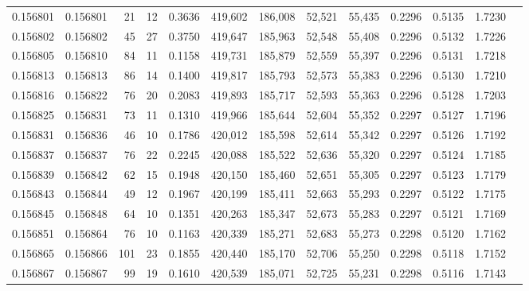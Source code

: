 \begin{tabular}{rrrrrrrrrrrrr}
0.156801 & 0.156801 &    21 &  12 &                                     0.3636 & 419,602 & 186,008 &  52,521 &  55,435 & 0.2296 & 0.5135 & 1.7230 \\
0.156802 & 0.156802 &    45 &  27 &                                     0.3750 & 419,647 & 185,963 &  52,548 &  55,408 & 0.2296 & 0.5132 & 1.7226 \\
0.156805 & 0.156810 &    84 &  11 &                                     0.1158 & 419,731 & 185,879 &  52,559 &  55,397 & 0.2296 & 0.5131 & 1.7218 \\
0.156813 & 0.156813 &    86 &  14 &                                     0.1400 & 419,817 & 185,793 &  52,573 &  55,383 & 0.2296 & 0.5130 & 1.7210 \\
0.156816 & 0.156822 &    76 &  20 &                                     0.2083 & 419,893 & 185,717 &  52,593 &  55,363 & 0.2296 & 0.5128 & 1.7203 \\
0.156825 & 0.156831 &    73 &  11 &                                     0.1310 & 419,966 & 185,644 &  52,604 &  55,352 & 0.2297 & 0.5127 & 1.7196 \\
0.156831 & 0.156836 &    46 &  10 &                                     0.1786 & 420,012 & 185,598 &  52,614 &  55,342 & 0.2297 & 0.5126 & 1.7192 \\
0.156837 & 0.156837 &    76 &  22 &                                     0.2245 & 420,088 & 185,522 &  52,636 &  55,320 & 0.2297 & 0.5124 & 1.7185 \\
0.156839 & 0.156842 &    62 &  15 &                                     0.1948 & 420,150 & 185,460 &  52,651 &  55,305 & 0.2297 & 0.5123 & 1.7179 \\
0.156843 & 0.156844 &    49 &  12 &                                     0.1967 & 420,199 & 185,411 &  52,663 &  55,293 & 0.2297 & 0.5122 & 1.7175 \\
0.156845 & 0.156848 &    64 &  10 &                                     0.1351 & 420,263 & 185,347 &  52,673 &  55,283 & 0.2297 & 0.5121 & 1.7169 \\
0.156851 & 0.156864 &    76 &  10 &                                     0.1163 & 420,339 & 185,271 &  52,683 &  55,273 & 0.2298 & 0.5120 & 1.7162 \\
0.156865 & 0.156866 &   101 &  23 &                                     0.1855 & 420,440 & 185,170 &  52,706 &  55,250 & 0.2298 & 0.5118 & 1.7152 \\
0.156867 & 0.156867 &    99 &  19 &                                     0.1610 & 420,539 & 185,071 &  52,725 &  55,231 & 0.2298 & 0.5116 & 1.7143 \\

\end{tabular}
